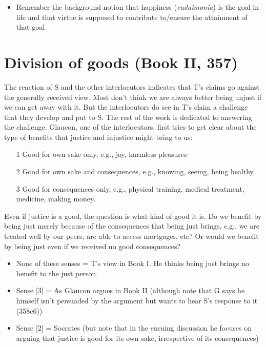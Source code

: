 \documentclass[oneside]{article}
\begin{document}
\begin{itemize}\item{Remember the background notion that happiness (\emph{eudaimonia}) is the goal in life and that virtue is supposed to contribute to/ensure the attainment of that goal}\end{itemize}

\section*{Division of goods (Book II, 357)}
The reaction of S and the other interlocutors indicates that T's claims go against the generally received view. Most don't think we are always better being unjust if we can get away with it. But the interlocutors do see in T's claim a challenge that they develop and put to S. The rest of the work is dedicated to answering the challenge. Glaucon, one of the interlocutors, first tries to get clear about the type of benefits that justice and injustice might bring to us: 

\begin{enumerate}
\item[1] Good for own sake only, e.g., joy, harmless pleasures
\item[2] Good for own sake and consequences, e.g., knowing, seeing, being healthy.
\item[3] Good for consequences only, e.g., physical training, medical treatment, medicine, making money.
\end{enumerate}
Even if justice is a good, the question is what kind of good it is. Do we benefit by being just merely because of the consequences that being just brings, e.g., we are treated well by our peers, are able to access mortgages, etc? Or would we benefit by being just even if we received no good consequences? 

\begin{itemize}
\item{None of these senses = T's view in Book I. He thinks being just brings no benefit to the just person.}
\item{Sense [3] = As Glaucon argues in Book II (although note that G says he himself isn't persuaded by the argument but wants to hear S's response to it (358c6))}
\item{Sense [2] = Socrates (but note that in the ensuing discussion he focuses on arguing that justice is good for its own sake, irrespective of its consequences)}
\end{itemize}
\end{document}
